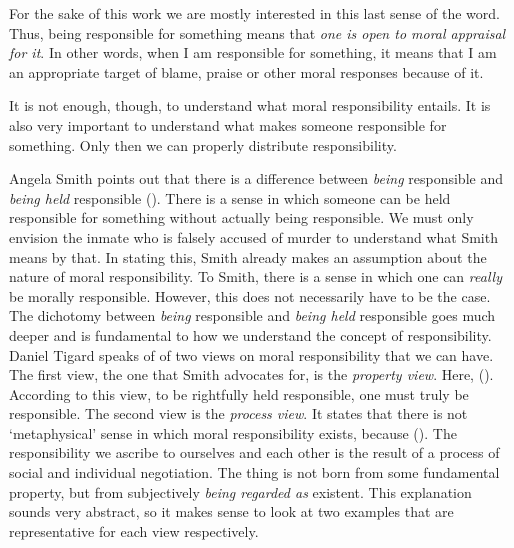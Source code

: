\documentclass{article}
\newcounter{example}
\begin{document}
For the sake of this work we are mostly interested in this last sense of the
word. Thus, being responsible for something means that \textit{one is open to moral
appraisal for it}. In other words, when I am responsible for something, it means
that I am an appropriate target of blame, praise or other moral responses
because of it. 

It is not enough, though, to understand what moral responsibility entails. It is
also very important to understand what makes someone responsible for something.
Only then we can properly distribute responsibility.

Angela Smith points out that there is a difference between \textit{being}
responsible and \textit{being held} responsible (\cite{Smith_2007}). There is a
sense in which someone can be held responsible for something without actually
being responsible. We must only envision the inmate who is falsely accused of
murder to understand what Smith means by that. In stating this, Smith
already makes an assumption about the nature of moral responsibility. To Smith,
there is a sense in which one can \textit{really} be morally responsible.
However, this does not necessarily have to be the case. The dichotomy between
\textit{being} responsible and \textit{being held} responsible goes much deeper
and is fundamental to how we understand the concept of responsibility. Daniel
Tigard speaks of of two views on moral responsibility that we can have. The
first view, the one that Smith advocates for, is the \textit{property view}.
Here,  (\cite[p. 439, italics in the
original]{tigard2021artificial}). According to this view, to be rightfully held
responsible, one must truly be responsible. The second view is the
\textit{process view}. It states that there is not `metaphysical' sense in which
moral responsibility exists, because  (\cite[p. 439, italics in the
original]{tigard2021artificial}). The responsibility we ascribe to ourselves and
each other is the result of a process of social and individual negotiation.
The thing is not born from some fundamental property, but from subjectively
\textit{being regarded as} existent. This explanation sounds very abstract, so
it makes sense to look at two examples that are representative for each view
respectively.
\end{document}
